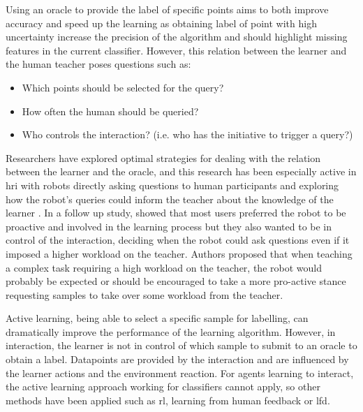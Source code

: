 Using an oracle to provide the label of specific points aims to both improve accuracy and speed up the learning as obtaining label of point with high uncertainty increase the precision of the algorithm and should highlight missing features in the current classifier. However, this relation between the learner and the human teacher poses questions such as: 
\begin{itemize}
	\item Which points should be selected for the query?
	\item How often the human should be queried?
	\item Who controls the interaction? (i.e. who has the initiative to trigger a query?)
\end{itemize}

Researchers have explored optimal strategies for dealing with the relation between the learner and the oracle, and this research has been especially active in \gls{hri} with robots directly asking questions to human participants and exploring how the robot's queries could inform the teacher about the knowledge of the learner \citep{chao2010transparent}. In a follow up study, \cite{cakmak2010designing} showed that most users preferred the robot to be proactive and involved in the learning process but they also wanted to be in control of the interaction, deciding when the robot could ask questions even if it imposed a higher workload on the teacher. Authors proposed that when teaching a complex task requiring a high workload on the teacher, the robot would probably be expected or should be encouraged to take a more pro-active stance requesting samples to take over some workload from the teacher.

Active learning, being able to select a specific sample for labelling, can dramatically improve the performance of the learning algorithm. However, in interaction, the learner is not in control of which sample to submit to an oracle to obtain a label. Datapoints are provided by the interaction and are influenced by the learner actions and the environment reaction. For agents learning to interact, the active learning approach working for classifiers cannot apply, so other methods have been applied such as \gls{rl}, learning from human feedback or \gls{lfd}.

